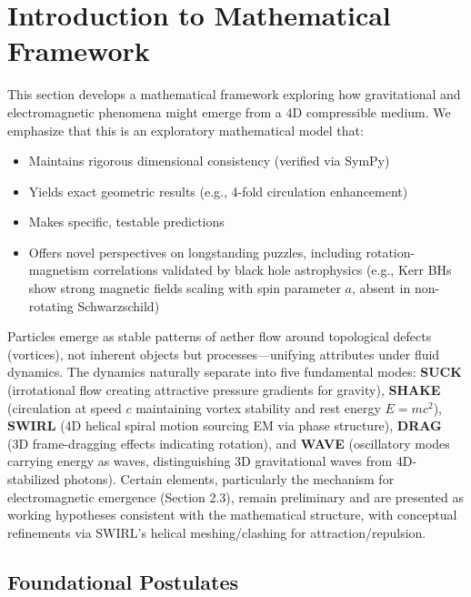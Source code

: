 \section{Introduction to Mathematical Framework}

This section develops a mathematical framework exploring how gravitational and electromagnetic phenomena might emerge from a 4D compressible medium. We emphasize that this is an exploratory mathematical model that:
\begin{itemize}
\item Maintains rigorous dimensional consistency (verified via SymPy)
\item Yields exact geometric results (e.g., 4-fold circulation enhancement)
\item Makes specific, testable predictions
\item Offers novel perspectives on longstanding puzzles, including rotation-magnetism correlations validated by black hole astrophysics (e.g., Kerr BHs show strong magnetic fields scaling with spin parameter $a$, absent in non-rotating Schwarzschild)
\end{itemize}
Particles emerge as stable patterns of aether flow around topological defects (vortices), not inherent objects but processes---unifying attributes under fluid dynamics. The dynamics naturally separate into five fundamental modes: \textbf{SUCK} (irrotational flow creating attractive pressure gradients for gravity), \textbf{SHAKE} (circulation at speed $c$ maintaining vortex stability and rest energy $E=mc^2$), \textbf{SWIRL} (4D helical spiral motion sourcing EM via phase structure), \textbf{DRAG} (3D frame-dragging effects indicating rotation), and \textbf{WAVE} (oscillatory modes carrying energy as waves, distinguishing 3D gravitational waves from 4D-stabilized photons). Certain elements, particularly the mechanism for electromagnetic emergence (Section 2.3), remain preliminary and are presented as working hypotheses consistent with the mathematical structure, with conceptual refinements via SWIRL's helical meshing/clashing for attraction/repulsion.

\subsection{Foundational Postulates}

